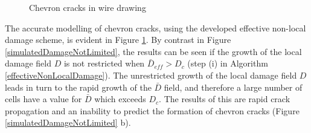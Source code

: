 \documentclass[sn-mathphys,Numbered,draft]{sn-jnl}%
\begin{document}
\begin{figure}[htbp]
	\centering
		
		
		\caption{Chevron cracks in wire drawing}
	\label{simulatedChevronCrack}
\end{figure}
\FloatBarrier

The accurate modelling of chevron cracks, using the developed effective non-local damage scheme, is evident in Figure \ref{simulatedChevronCrack}. By contrast in Figure \ref{simulatedDamageNotLimited}, the results can be seen if the growth of the local damage field $D$ is not restricted when $\bar{D}_{eff}>D_c$ (step (i) in Algorithm \ref{effectiveNonLocalDamage}). The unrestricted growth of the local damage field $D$ leads in turn to the rapid growth of the $\bar{D}$ field, and therefore a large number of cells have a value for $\bar{D}$ which exceeds $D_c$. The results of this are rapid crack propagation and an inability to predict the formation of chevron cracks (Figure \ref{simulatedDamageNotLimited} b). 
\end{document}
